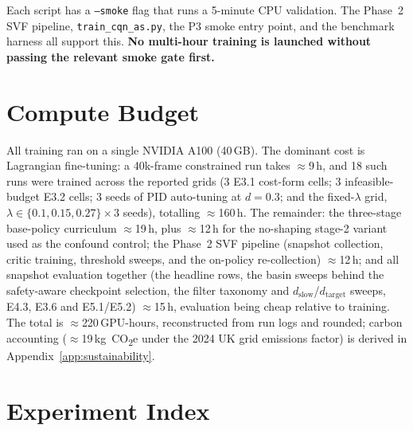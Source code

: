 \documentclass[11pt,a4paper]{report}
\begin{document}
Each script has a \texttt{--smoke} flag that runs a 5-minute CPU
validation. The Phase~2 SVF pipeline,
\texttt{train\_cqn\_as.py}, the P3 smoke entry point, and the
benchmark harness all support this. \textbf{No multi-hour training
is launched without passing the relevant smoke gate first.}

\section{Compute Budget}
\label{sec:setup:compute}

All training ran on a single NVIDIA A100 (40\,GB). The dominant cost
is Lagrangian fine-tuning: a 40k-frame constrained run takes
$\approx$9\,h, and 18 such runs were trained across the reported
grids (3 E3.1 cost-form cells; 3 infeasible-budget E3.2 cells; 3
seeds of PID auto-tuning at $d = 0.3$; and the fixed-$\lambda$ grid,
$\lambda \in \{0.1, 0.15, 0.27\} \times 3$ seeds), totalling
$\approx$160\,h. The remainder: the three-stage base-policy
curriculum $\approx$19\,h, plus $\approx$12\,h for the no-shaping
stage-2 variant used as the confound control; the Phase~2 SVF
pipeline (snapshot collection, critic training, threshold sweeps,
and the on-policy re-collection) $\approx$12\,h; and all
snapshot evaluation together (the headline rows, the basin sweeps
behind the safety-aware checkpoint selection, the filter taxonomy
and $d_{\mathrm{slow}}$/$d_{\mathrm{target}}$ sweeps, E4.3, E3.6 and
E5.1/E5.2) $\approx$15\,h, evaluation being cheap relative to
training. The total is $\approx$220\,GPU-hours, reconstructed from
run logs and rounded; carbon accounting
($\approx$19\,kg~CO\textsubscript{2}e under the 2024 UK grid
emissions factor) is derived in Appendix~\ref{app:sustainability}.

\section{Experiment Index}
\label{sec:setup:exp-index}
\end{document}
